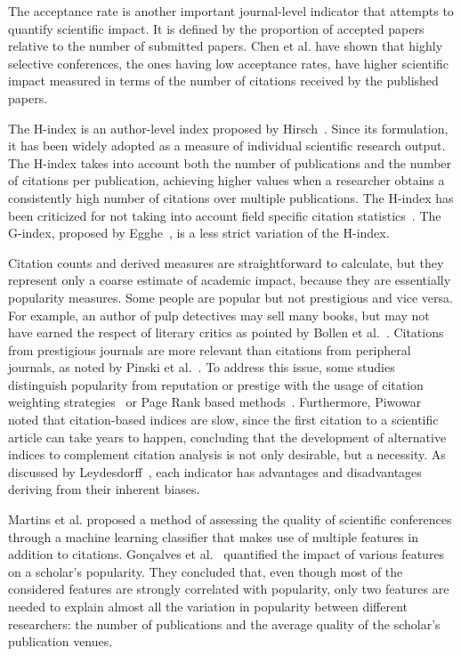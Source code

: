 \documentclass[notitlepage]{svjour3}
\begin{document}
The acceptance rate is another important journal-level indicator that attempts to quantify scientific impact. It
is defined by the proportion of accepted papers relative to the number of submitted papers. Chen et al. \cite{Chen2010} 
have shown that highly selective conferences, the ones having low acceptance rates, have higher 
scientific impact measured in terms of the number of citations received by the published papers.

The H-index is an author-level index proposed by Hirsch~\cite{Hirsch2005}. Since its formulation, it has been 
widely adopted as a measure of individual scientific research output.
The H-index takes into account both the number of publications and the number of citations per publication, 
achieving higher values when a researcher obtains a consistently high number of citations over multiple publications. 
The H-index has been criticized for not taking into account field specific citation
statistics~\cite{Wendl2007}. The G-index, proposed by Egghe~\cite{Egghe2006}, is a less strict variation 
of the H-index.

Citation counts and derived measures are straightforward to calculate, but they represent only a coarse
estimate of academic impact, because they are essentially popularity measures. Some people are popular but not 
prestigious and vice versa. For example, an author of pulp detectives may sell many books, but may not have earned 
the respect of literary critics as pointed by Bollen et al.~\cite{Bollen2006}. Citations from 
prestigious journals are more relevant than citations from peripheral journals, as noted by Pinski et al.~\cite{Pinski1976}. To address this issue, some studies distinguish popularity from 
reputation or prestige with the usage of citation weighting strategies~\cite{Ding2011,Yan2011a} or 
Page Rank based methods~\cite{Bollen2006,Sun2007}. 
Furthermore, Piwowar~\cite{Piwowar2013} noted that citation-based indices are slow, since the 
first citation to a scientific article can take years to happen, concluding that the development of 
alternative indices to complement citation analysis is not only desirable, but a necessity.
As discussed by Leydesdorff~\cite{Leydesdorff2009}, each indicator has advantages and disadvantages 
deriving from their inherent biases.

Martins et al. \cite{Martins2009} proposed a method of assessing the quality of scientific conferences 
through a machine learning classifier that makes use of multiple features in addition to citations.
Gonçalves et al.~\cite{Goncalves2014} quantified the impact of various features on a 
scholar's popularity. They concluded that, even though most of the considered features are strongly correlated 
with popularity, only two features are needed to explain almost all the variation in popularity between different 
researchers: the number of publications and the average quality of the scholar’s publication venues. 
\end{document}

